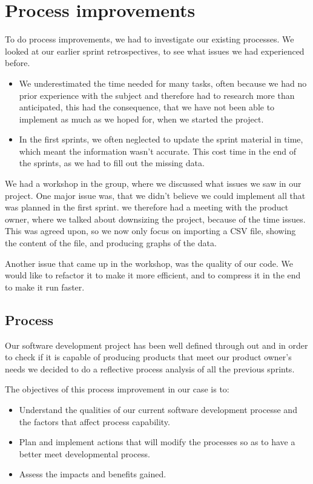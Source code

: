 \section{Process improvements} %
\label{sec:improvements}
To do process improvements, we had to investigate our existing processes. We looked at our earlier sprint retrospectives, to see what issues we had experienced before.
\begin{itemize}
	\item We underestimated the time needed for many tasks, often because we had no prior experience with the subject and therefore had to research more than anticipated, this had the consequence, that we have not been able to implement as much as we hoped for, when we started the project.
	\item In the first sprints, we often neglected to update the sprint material in time, which meant the information wasn't accurate. This cost time in the end of the sprints, as we had to fill out the missing data.
\end{itemize}

We had a workshop in the group, where we discussed what issues we saw in our project. One major issue was, that we didn't believe we could implement all that was planned in the first sprint.
we therefore had a meeting with the product owner, where we talked about downsizing the project, because of the time issues. This was agreed upon, so we now only focus on importing a CSV file, showing the content of the file, and producing graphs of the data.

Another issue that came up in the workshop, was the quality of our code. We would like to refactor it to make it more efficient, and to compress it in the end to make it run faster.
\subsection{Process} %
\label{sec:Process}

Our software development project has been well defined through out and in order to check if it is capable of producing products that meet our product owner's needs we decided to do a reflective process analysis of all the previous sprints.

The objectives of this process improvement in our case is to:

\begin{itemize}
	\item Understand the qualities of our current software development processe and the factors that affect process capability.
	\item Plan and implement actions that will modify the processes so as to have a better meet developmental process.
	\item Assess the impacts and benefits gained.
\end{itemize}

